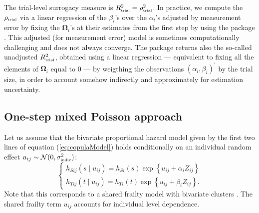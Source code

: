 \documentclass[]{scrartcl}\usepackage[]{graphicx}\usepackage[]{color}
\begin{document}
{{The trial-level surrogacy measure is
  $R_\text{\tiny trial}^2 = \rho_\text{\tiny trial}^2$.
In practice, we compute the $\rho_\text{\tiny trial}$ 
  via a linear regression of the $\beta_i$'s over the $\alpha_i$'s
  adjusted by measurement error by fixing the $\bm\Omega_i$'s at their estimates
  from the first step \citep{vanHouwelingenEtal02}
  by using the  package \citep{GasparriniEtal12, R:mvmeta}.
This adjusted (for measurement error) model is sometimes computationally challenging
  and does not always converge.
The  package returns also the so-called
  unadjusted $R_\text{\tiny trial}^2$,
  obtained using a linear regression ---
  equivalent to fixing all the elements of $\bm\Omega_i$ equal to 0 ---
  by weigthing the observations $(\alpha_i, \beta_i)^\prime$ by the trial size,
  in order to account somehow indirectly and approximately for estimation uncertainty.



\subsection{One-step mixed Poisson approach}

Let us assume that the bivariate proportional hazard model given by the first
  two lines of equation (\ref{eq:copulaModel}) holds conditionally
  on an individual random effect
  $u_{ij} \sim \mathcal N(0, \sigma^2_\text{\tiny indiv})$:
  \begin{equation}
    \begin{cases}
      h_{Sij}(s\mid u_{ij}) = h_{S i}(s)
      \exp\left\{u_{ij} + \alpha_i Z_{ij} \right\}\\
      h_{Tij}(t\mid u_{ij}) = h_{T i}(t)
      \exp\left\{u_{ij} + \beta_i Z_{ij}\right\}.
    \end{cases}
    \label{eq:biHaz}
  \end{equation}
Note that this corresponds to a  shared frailty model with 
  bivariate clusters \citep{DuchateauJanssen08}.
The shared frailty term $u_{ij}$ accounts for individual level dependence.

}}
\end{document}
